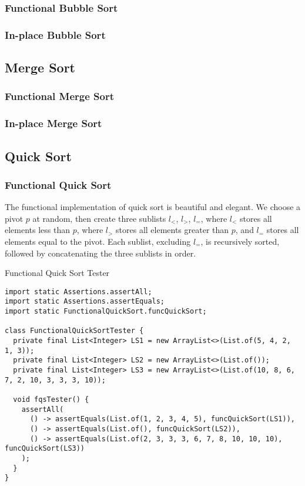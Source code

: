 \subsubsection*{Functional Bubble Sort}
\subsubsection*{In-place Bubble Sort}

\subsection{Merge Sort}
\subsubsection*{Functional Merge Sort}
\subsubsection*{In-place Merge Sort}

\subsection{Quick Sort}
\subsubsection*{Functional Quick Sort}
The functional implementation of quick sort is beautiful and elegant. We choose a pivot $p$ at random, then create three sublists $l_<$, $l_>$, $l_=$, where $l_<$ stores all elements less than $p$, where $l_>$ stores all elements greater than $p$, and $l_=$ stores all elements equal to the pivot. Each sublist, excluding $l_=$, is recursively sorted, followed by concatenating the three sublists in order. 
\begin{cl}{Functional Quick Sort Tester}
\begin{lstlisting}[language=MyJava]
import static Assertions.assertAll;
import static Assertions.assertEquals;
import static FunctionalQuickSort.funcQuickSort;

class FunctionalQuickSortTester {
  private final List<Integer> LS1 = new ArrayList<>(List.of(5, 4, 2, 1, 3));
  private final List<Integer> LS2 = new ArrayList<>(List.of());
  private final List<Integer> LS3 = new ArrayList<>(List.of(10, 8, 6, 7, 2, 10, 3, 3, 3, 10));

  void fqsTester() {
    assertAll(
      () -> assertEquals(List.of(1, 2, 3, 4, 5), funcQuickSort(LS1)),
      () -> assertEquals(List.of(), funcQuickSort(LS2)),
      () -> assertEquals(List.of(2, 3, 3, 3, 6, 7, 8, 10, 10, 10), funcQuickSort(LS3))
    );
  }
}
\end{lstlisting}
\end{cl}

